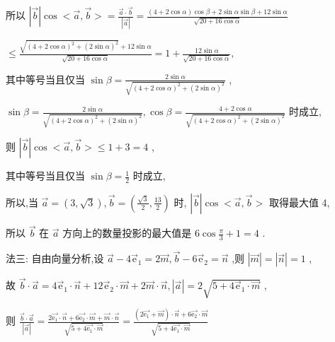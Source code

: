 \documentclass[10pt]{article}
\begin{document}
所以 \(\left| \overrightarrow{b}\right| \cos  < \overrightarrow{a},\overrightarrow{b} >  = \frac{\overrightarrow{a} \cdot  \overrightarrow{b}}{\left| \overrightarrow{a}\right| } = \frac{\left( {4 + 2\cos \alpha }\right) \cos \beta  + 2\sin \alpha \sin \beta  + {12}\sin \alpha }{\sqrt{{20} + {16}\cos \alpha }}\)

\(\leq  \frac{\sqrt{{\left( 4 + 2\cos \alpha \right) }^{2} + {\left( 2\sin \alpha \right) }^{2}} + {12}\sin \alpha }{\sqrt{{20} + {16}\cos \alpha }} = 1 + \frac{{12}\sin \alpha }{\sqrt{{20} + {16}\cos \alpha }},\)

其中等号当且仅当 \(\sin \beta  = \frac{2\sin \alpha }{\sqrt{{\left( 4 + 2\cos \alpha \right) }^{2} + {\left( 2\sin \alpha \right) }^{2}}}\) ,

\(\sin \beta  = \frac{2\sin \alpha }{\sqrt{{\left( 4 + 2\cos \alpha \right) }^{2} + {\left( 2\sin \alpha \right) }^{2}}},\cos \beta  = \frac{4 + 2\cos \alpha }{\sqrt{{\left( 4 + 2\cos \alpha \right) }^{2} + {\left( 2\sin \alpha \right) }^{2}}}\) 时成立,

则 \(\left| \overrightarrow{b}\right| \cos  < \overrightarrow{a},\overrightarrow{b} >  \leq  1 + 3 = 4\) ,

其中等号当且仅当 \(\sin \beta  = \frac{1}{2}\) 时成立,

所以,当 \(\overrightarrow{a} = \left( {3,\sqrt{3}}\right) ,\overrightarrow{b} = \left( {\frac{\sqrt{3}}{2},\frac{13}{2}}\right)\) 时, \(\left| \overrightarrow{b}\right| \cos  < \overrightarrow{a},\overrightarrow{b} >\) 取得最大值 4,

所以 \(\overrightarrow{b}\) 在 \(\overrightarrow{a}\) 方向上的数量投影的最大值是 \(6\cos \frac{\pi }{3} + 1 = 4\) .

法三: 自由向量分析,设 \(\overrightarrow{a} - 4{\overrightarrow{\mathrm{e}}}_{1} = 2\overrightarrow{m},\overrightarrow{b} - 6{\overrightarrow{\mathrm{e}}}_{2} = \overrightarrow{n}\) ,则 \(\left| \overrightarrow{m}\right|  = \left| \overrightarrow{n}\right|  = 1\) ,

故 \(\overrightarrow{b} \cdot  \overrightarrow{a} = 4{\overrightarrow{\mathrm{e}}}_{1} \cdot  \overrightarrow{n} + {12}{\overrightarrow{\mathrm{e}}}_{2} \cdot  \overrightarrow{m} + 2\overrightarrow{m} \cdot  \overrightarrow{n},\left| \overrightarrow{a}\right|  = 2\sqrt{5 + 4{\overrightarrow{\mathrm{e}}}_{1} \cdot  \overrightarrow{m}}\) ,

则 \(\frac{\overrightarrow{b} \cdot  \overrightarrow{a}}{\left| \overrightarrow{a}\right| } = \frac{2\overrightarrow{{\mathrm{e}}_{1}} \cdot  \overrightarrow{n} + 6\overrightarrow{{\mathrm{e}}_{2}} \cdot  \overrightarrow{m} + \overrightarrow{m} \cdot  \overrightarrow{n}}{\sqrt{5 + 4\overrightarrow{{\mathrm{e}}_{1}} \cdot  \overrightarrow{m}}} = \frac{\left( {2\overrightarrow{{\mathrm{e}}_{1}} + \overrightarrow{m}}\right)  \cdot  \overrightarrow{n} + 6\overrightarrow{{\mathrm{e}}_{2}} \cdot  \overrightarrow{m}}{\sqrt{5 + 4\overrightarrow{{\mathrm{e}}_{1}} \cdot  \overrightarrow{m}}}\)
\end{document}
